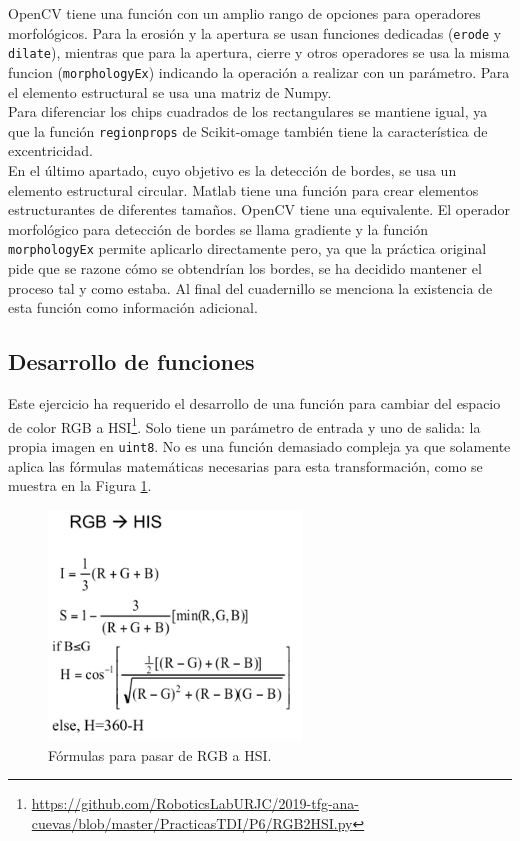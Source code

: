 OpenCV tiene una función con un amplio rango de opciones para operadores morfológicos.  Para la erosión y la apertura se usan funciones dedicadas (\texttt{erode} y \texttt{dilate}), mientras que para la apertura, cierre y otros operadores se usa la misma funcion (\texttt{morphologyEx}) indicando la operación a realizar con un parámetro. Para el elemento estructural se usa una matriz de Numpy.\\

Para diferenciar los chips cuadrados de los rectangulares se mantiene igual, ya que la función \texttt{regionprops} de Scikit-omage también tiene la característica de excentricidad.\\

En el último apartado, cuyo objetivo es la detección de bordes, se usa un elemento estructural circular. Matlab  tiene una función para crear elementos  estructurantes de diferentes tamaños. OpenCV tiene una equivalente. El operador morfológico para detección de bordes se llama gradiente y la función \texttt{morphologyEx} permite aplicarlo directamente pero, ya que la práctica original pide que se razone cómo se obtendrían los bordes, se ha decidido mantener el proceso tal y como estaba. Al final del cuadernillo se menciona la existencia de esta función como información adicional.

\subsection{Desarrollo de funciones}

Este ejercicio ha requerido el desarrollo de una función para cambiar del espacio de color RGB a HSI\footnote{\url{https://github.com/RoboticsLabURJC/2019-tfg-ana-cuevas/blob/master/PracticasTDI/P6/RGB2HSI.py}}. Solo tiene un parámetro de entrada y uno de salida: la propia imagen en \texttt{uint8}. No es una función demasiado compleja ya que solamente aplica las fórmulas matemáticas necesarias para esta transformación, como se muestra en la Figura \ref{rgb2hsi}.

\begin{figure}[h]
\centering
\includegraphics[width=0.6\textwidth]{imagenes/rgb2hsi}
\caption{Fórmulas para pasar de RGB a HSI.}
\label{rgb2hsi} 
\end{figure}

